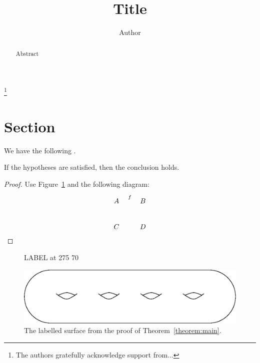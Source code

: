 \documentclass[12pt]{amsart}
\begin{document}


\title{Title}

\author{Author}

\address{Street, City, State, Country email}

\thanks{The authors gratefully acknowledge support from...}





\begin{abstract}
Abstract
\end{abstract}

\maketitle

\section{Section}

We have the following \cite[Theorem 1]{euclid}.

\begin{theorem}
\label{theorem:main}
If the hypotheses are satisfied, then the conclusion holds.
\end{theorem}

\begin{proof}

Use Figure~\ref{figure:surface} and the following diagram:
\[
\xymatrix{
A \ar[r]^f\ar[d] & B \ar[d] \\
C \ar[r] & D 
}
\]
%
\end{proof}

\begin{figure}[htb]
 \small\hair 2pt
\pinlabel LABEL at 275 70
\endlabellist
\centerline{\includegraphics[scale=.65]{surface}}
\caption{The labelled surface from the proof of Theorem~\ref{theorem:main}.}
\label{figure:surface}
\end{figure}



\end{document}

